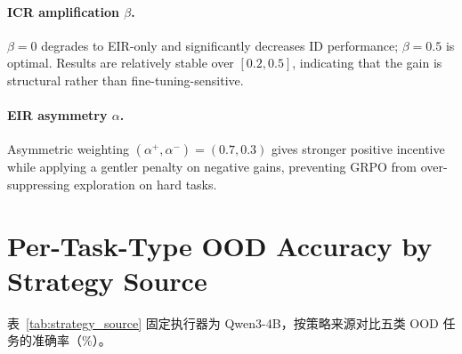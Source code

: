 \documentclass[11pt]{article}
\begin{document}
\paragraph{ICR amplification $\beta$.}
$\beta{=}0$ degrades to EIR-only and significantly decreases ID performance; $\beta{=}0.5$ is optimal.
Results are relatively stable over $[0.2, 0.5]$, indicating that the gain is structural rather than fine-tuning-sensitive.

\paragraph{EIR asymmetry $\alpha$.}
Asymmetric weighting $(\alpha^+, \alpha^-)=(0.7, 0.3)$ gives stronger positive incentive while applying a gentler penalty on negative gains, preventing GRPO from over-suppressing exploration on hard tasks.

\section{Per-Task-Type OOD Accuracy by Strategy Source}
\label{app:strategy_source}

表~\ref{tab:strategy_source} 固定执行器为 Qwen3-4B，按策略来源对比五类 OOD 任务的准确率（\%）。
\end{document}
